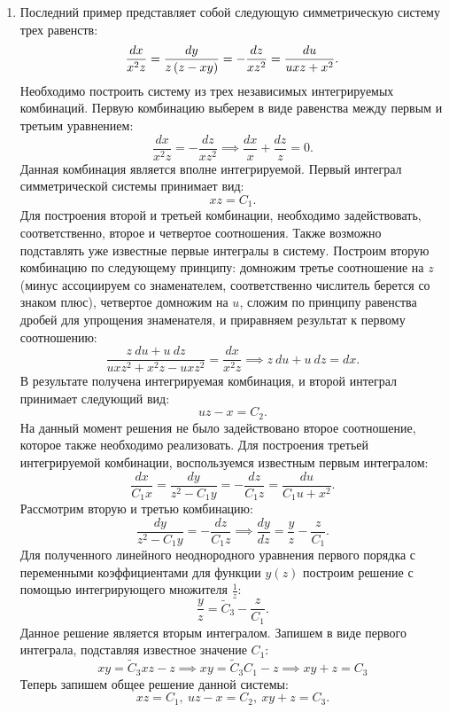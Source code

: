 \begin{enumerate}
			\item Последний пример представляет собой следующую симметрическую систему трех равенств:
				\[ \frac{dx}{x^2 z} = \frac{dy}{z \left( z - xy \right)} = - \frac{dz}{x z^2} = \frac{du}{uxz + x^2}. \] %
				Необходимо построить систему из трех независимых интегрируемых комбинаций. Первую комбинацию выберем в виде равенства между первым и третьим уравнением:
				\[ \frac{dx}{x^2 z} = - \frac{dz}{x z^2} \implies \frac{dx}{x} + \frac{dz}{z} = 0. \]
				Данная комбинация является вполне интегрируемой. Первый интеграл симметрической системы принимает вид:
				\[ xz = C_1. \]
				Для построения второй и третьей комбинации, необходимо задействовать, соответственно, второе и четвертое соотношения. Также возможно подставлять уже известные первые интегралы в систему. Построим вторую комбинацию по следующему принципу: домножим третье соотношение на $z$ (минус ассоциируем со знаменателем, соответственно числитель берется со знаком плюс), четвертое домножим на $u$, сложим по принципу равенства дробей для упрощения знаменателя, и приравняем результат к первому соотношению:
				\[ \frac{z ~ du + u ~ dz}{uxz^2 + x^2 z - uxz^2} = \frac{dx}{x^2 z} \implies z ~ du + u ~ dz = dx. \]
				В результате получена интегрируемая комбинация, и второй интеграл принимает следующий вид:
				\[ uz - x = C_2. \]
				На данный момент решения не было задействовано второе соотношение, которое также необходимо реализовать. Для построения третьей интегрируемой комбинации, воспользуемся известным первым интегралом:
				\[ \frac{dx}{C_1 x} = \frac{dy}{z^2 - C_1 y} = - \frac{dz}{C_1 z} = \frac{du}{C_1 u + x^2}. \] %
				Рассмотрим вторую и третью комбинацию:
				\[ \frac{dy}{z^2 - C_1 y} = - \frac{dz}{C_1 z} \implies \frac{dy}{dz} = \frac{y}{z} - \frac{z}{C_1}. \]
				Для полученного линейного неоднородного уравнения первого порядка с переменными коэффициентами для функции $y(z)$ построим решение с помощью интегрирующего множителя $\frac{1}{z}$:
				\[ \frac{y}{z} = \tilde{C}_3 - \frac{z}{C_1}. \]
				Данное решение является вторым интегралом. Запишем в виде первого интеграла, подставляя известное значение $C_1$:
				\[ xy = \tilde{C}_3 xz - z \implies xy = \tilde{C}_3 C_1 - z \implies xy + z = C_3 \]
				Теперь запишем общее решение данной системы:
				\[ xz = C_1, ~ uz - x = C_2, ~ xy + z = C_3. \]
				
		\end{enumerate}

